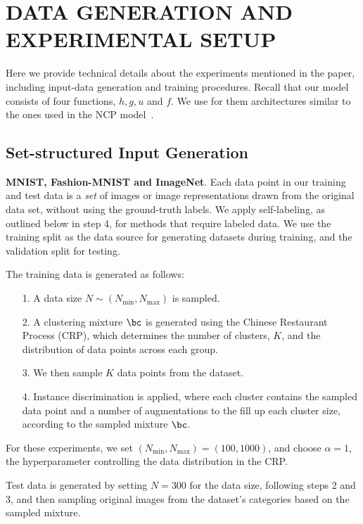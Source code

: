 

\section{DATA GENERATION AND EXPERIMENTAL SETUP}
\label{sec:data_gen_and_experimental_setup}

Here we provide technical details about the experiments mentioned in the paper, including input-data generation and training procedures. Recall that our model consists of four functions, $h,g,u$ and $f$. We use for them architectures similar to the ones used in the NCP model~\citep{pakman2020}.

\subsection{Set-structured Input Generation}
\label{sec:data_generation}
\textbf{MNIST, Fashion-MNIST and ImageNet}. Each data point in our training and test data is a \textit{set} of images or image representations drawn from the original data set, without using the ground-truth labels. We apply self-labeling, as outlined below in step 4, for methods that require labeled data.
%
We use the training split as the data source for generating datasets during training, and the validation split for testing.

The training data is generated as follows:
\begin{itemize}
    \item[1.] A data size $N \sim (N_{\text{min}}, N_{\text{max}})$ is sampled.
    \item[2.] A clustering mixture $\bc$ is generated using the Chinese Restaurant Process (CRP), which determines the number of clusters, $K$, and the distribution of data points across each group.
    \item[3.] We then sample $K$ data points from the dataset.
    \item[4.] Instance discrimination is applied, where each cluster contains the sampled data point and a number of augmentations to the fill up each cluster size, according to the sampled mixture $\bc$. 
\end{itemize}

For these experiments, we set $(N_{\text{min}}, N_{\text{max}}) = (100, 1000)$, and choose $\alpha=1$, the hyperparameter controlling the data distribution in the CRP.

Test data is generated by setting $N=300$ for the data size, following steps 2 and 3, and then sampling original images from the dataset's categories based on the sampled mixture. 

